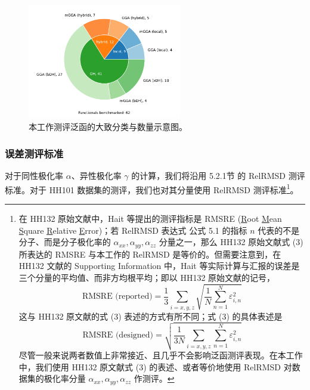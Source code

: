 \begin{figure}[hp]
    \centering
    \caption{本工作测评泛函的大致分类与数量示意图。}
    \label{fig.6.pol-functionals-distribution}
    \includegraphics[width=0.6\textwidth]{assets/pol-functionals-distribution.pdf}
\end{figure}

\subsubsection{误差测评标准}

对于同性极化率 $\alpha$、异性极化率 $\gamma$ 的计算，我们将沿用 \alert{5.2.1节} 的 RelRMSD 测评标准。对于 HH101 数据集的测评，我们也对其分量使用 RelRMSD 测评标准\footnote{在 HH132 原始文献\cite{Hait-Head-Gordon.PCCP.2018}中，Hait 等提出的测评指标是 RMSRE (\underline{R}oot \underline{M}ean \underline{S}quare \underline{R}elative \underline{E}rror)；若 RelRMSD 表达式 \alert{公式 5.1} 的指标 $n$ 代表的不是分子、而是分子极化率的 $\alpha_{xx}, \alpha_{yy}, \alpha_{zz}$ 分量之一，那么 HH132 原始文献式 (3) 所表达的 RMSRE 与本工作的 RelRMSD 是等价的。但需要注意到，在 HH132 文献的 Supporting Information 中，Hait 等实际计算与汇报的误差是三个分量的平均值、而非方均根平均；即以 HH132 原始文献的记号，
$$
\text{RMSRE (reported)} = \frac{1}{3} \sum_{i=x,y,z} \sqrt{\frac{1}{N} \sum_{n=1}^N \varepsilon_{i,n}^2}
$$
这与 HH132 原文献的式 (3) 表述的方式有所不同；式 (3) 的具体表述是
\begin{equation}
    \label{eq.6.rmsre}
    \text{RMSRE (designed)} = \sqrt{\frac{1}{3N} \sum_{i=x,y,z} \sum_{n=1}^N \varepsilon_{i,n}^2}
\end{equation}
尽管一般来说两者数值上非常接近、且几乎不会影响泛函测评表现。在本工作中，我们使用 HH132 原文献式 (3) 的表述、或者等价地使用 RelRMSD 对数据集的极化率分量 $\alpha_{xx}, \alpha_{yy}, \alpha_{zz}$ 作测评。
}。

